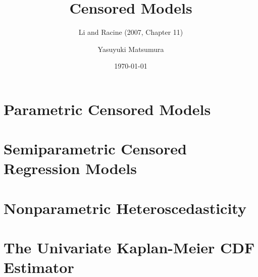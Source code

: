 \documentclass[xcolor=svgnames,dvipdfmx,cjk]{beamer}
\theoremstyle{example}
\begin{document}
 

\title{Censored Models} 
\subtitle{Li and Racine (2007, Chapter 11)}
\author{Yasuyuki Matsumura}
\date{\today} %

\begin{frame}                  
\titlepage            
\end{frame}



\section{Parametric Censored Models}






\section{Semiparametric Censored Regression Models}








\section{Nonparametric Heteroscedasticity}










\section{The Univariate Kaplan-Meier CDF Estimator}
\end{document}
